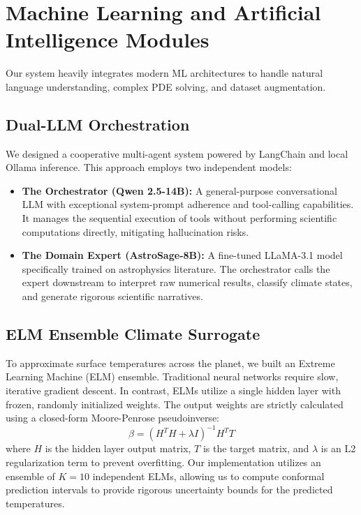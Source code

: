 \documentclass[12pt,a4paper]{article}
\begin{document}
\newpage
\section{Machine Learning and Artificial Intelligence Modules}
Our system heavily integrates modern ML architectures to handle natural language understanding, complex PDE solving, and dataset augmentation. 

\subsection{Dual-LLM Orchestration}
We designed a cooperative multi-agent system powered by LangChain and local Ollama inference. This approach employs two independent models:
\begin{itemize}
    \item \textbf{The Orchestrator (Qwen 2.5-14B):} A general-purpose conversational LLM with exceptional system-prompt adherence and tool-calling capabilities. It manages the sequential execution of tools without performing scientific computations directly, mitigating hallucination risks.
    \item \textbf{The Domain Expert (AstroSage-8B):} A fine-tuned LLaMA-3.1 model specifically trained on astrophysics literature. The orchestrator calls the expert downstream to interpret raw numerical results, classify climate states, and generate rigorous scientific narratives.
\end{itemize}

\subsection{ELM Ensemble Climate Surrogate}
To approximate surface temperatures across the planet, we built an Extreme Learning Machine (ELM) ensemble. Traditional neural networks require slow, iterative gradient descent. In contrast, ELMs utilize a single hidden layer with frozen, randomly initialized weights. The output weights are strictly calculated using a closed-form Moore-Penrose pseudoinverse:
\begin{equation}
\beta = (H^T H + \lambda I)^{-1} H^T T
\end{equation}
where $H$ is the hidden layer output matrix, $T$ is the target matrix, and $\lambda$ is an L2 regularization term to prevent overfitting. Our implementation utilizes an ensemble of $K=10$ independent ELMs, allowing us to compute conformal prediction intervals to provide rigorous uncertainty bounds for the predicted temperatures.
\end{document}
